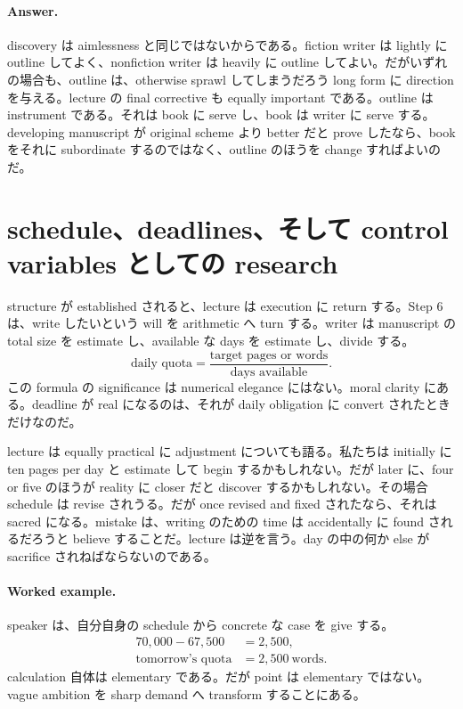 \paragraph{Answer.} discovery は aimlessness と同じではないからである。fiction writer は lightly に outline してよく、nonfiction writer は heavily に outline してよい。だがいずれの場合も、outline は、otherwise sprawl してしまうだろう long form に direction を与える。lecture の final corrective も equally important である。outline は instrument である。それは book に serve し、book は writer に serve する。developing manuscript が original scheme より better だと prove したなら、book をそれに subordinate するのではなく、outline のほうを change すればよいのだ。

\section{schedule、deadlines、そして control variables としての research}

structure が established されると、lecture は execution に return する。Step 6 は、write したいという will を arithmetic へ turn する。writer は manuscript の total size を estimate し、available な days を estimate し、divide する。
\begin{equation}
\text{daily quota} = \frac{\text{target pages or words}}{\text{days available}}.
\end{equation}
この formula の significance は numerical elegance にはない。moral clarity にある。deadline が real になるのは、それが daily obligation に convert されたときだけなのだ。

lecture は equally practical に adjustment についても語る。私たちは initially に ten pages per day と estimate して begin するかもしれない。だが later に、four or five のほうが reality に closer だと discover するかもしれない。その場合 schedule は revise されうる。だが once revised and fixed されたなら、それは sacred になる。mistake は、writing のための time は accidentally に found されるだろうと believe することだ。lecture は逆を言う。day の中の何か else が sacrifice されねばならないのである。

\paragraph{Worked example.} speaker は、自分自身の schedule から concrete な case を give する。
\begin{align}
70{,}000 - 67{,}500 &= 2{,}500,\\
\text{tomorrow's quota} &= 2{,}500\ \text{words}.
\end{align}
calculation 自体は elementary である。だが point は elementary ではない。vague ambition を sharp demand へ transform することにある。

